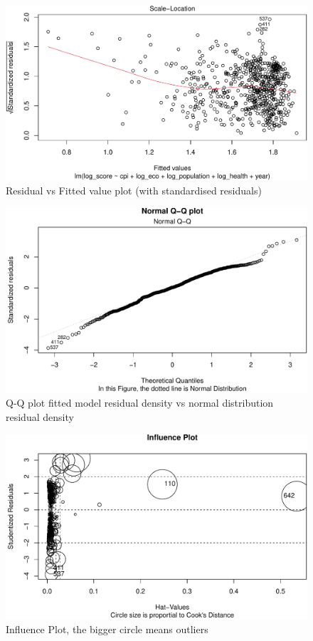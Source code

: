 \documentclass[11pt,a4paper,]{article}
\begin{document}
\begin{figure}
\centering
\includegraphics{Assignment4_files/figure-latex/resd-1.pdf}
\caption{\label{fig:resd}Residual vs Fitted value plot (with standardised residuals)}
\end{figure}

\begin{figure}
\centering
\includegraphics{Assignment4_files/figure-latex/qq-1.pdf}
\caption{\label{fig:qq}Q-Q plot fitted model residual density vs normal distribution residual density}
\end{figure}

\begin{figure}
\centering
\includegraphics{Assignment4_files/figure-latex/inf-1.pdf}
\caption{\label{fig:inf}Influence Plot, the bigger circle means outliers}
\end{figure}
\end{document}

